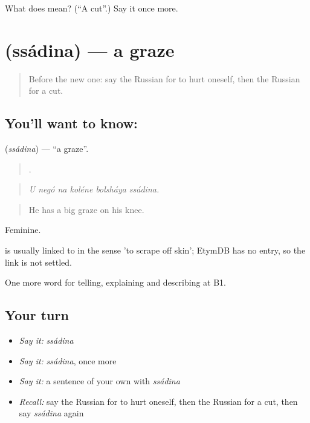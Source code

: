 \begin{tcolorbox}[breakable,colback=teal!4,colframe=teal!35!black,title={Before you move on}]
What does  mean? (\textquotedblleft{}A cut\textquotedblright{}.) Say it once more.
\end{tcolorbox}
\section[\texorpdfstring{\ru{ссадина} (ssádina)}{ссадина (ssádina)}]{ (ssádina) — a graze}

\label{lesson:RU-C483-ssadina}



\begin{quote}
Before the new one: say the Russian for to hurt oneself, then the Russian for a cut.
\end{quote}

\subsection*{You'll want to know: }
\textbf{} (\emph{ssádina}) — \textquotedblleft{}a graze\textquotedblright{}.

\begin{quote}
     .
\end{quote}

\begin{quote}
\emph{U negó na koléne bolsháya ssádina.}
\end{quote}

\begin{quote}
He has a big graze on his knee.
\end{quote}

Feminine.

\begin{cousinweb}
\emph{} is usually linked to \emph{} in the sense 'to scrape off skin'; EtymDB has no entry, so the link is not settled.
\end{cousinweb}

\begin{grammarlens}[title={What you've built}]
One more word for telling, explaining and describing at B1.
\end{grammarlens}

\subsection*{Your turn}
\begin{itemize}
\raggedright
  \item \emph{Say it:} \emph{ssádina}
  \item \emph{Say it:} \emph{ssádina}, once more
  \item \emph{Say it:} a sentence of your own with \emph{ssádina}
  \item \emph{Recall:} say the Russian for to hurt oneself, then the Russian for a cut, then say \emph{ssádina} again
\end{itemize}

